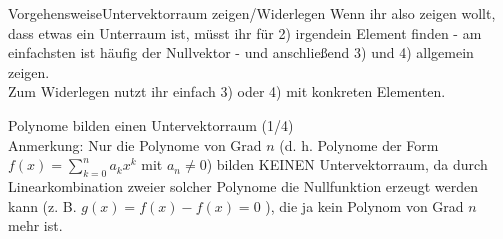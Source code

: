 \begin{Satz}
{Vorgehensweise}{Untervektorraum zeigen/Widerlegen}
Wenn ihr also zeigen wollt, dass etwas ein Unterraum ist, müsst ihr für 2) irgendein Element finden - am einfachsten ist häufig der Nullvektor - und anschließend 3) und 4) allgemein zeigen.\\
Zum Widerlegen nutzt ihr einfach 3) oder 4) mit konkreten Elementen.
\end{Satz}
\begin{Beispiel}
{Polynome bilden einen Untervektorraum (1/4)}
\\
Anmerkung: Nur die Polynome von Grad $n$ (d. h. Polynome der Form $f(x)=\sum_{k=0}^na_kx^k$ mit $a_n\neq0$) bilden KEINEN Untervektorraum, da durch Linearkombination zweier solcher Polynome die Nullfunktion erzeugt werden kann (z. B. $g(x)=f(x)-f(x)=0$ \Lightning), die ja kein Polynom von Grad $n$ mehr ist.
\end{Beispiel}
